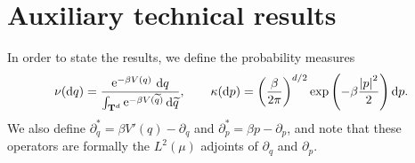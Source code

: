 \documentclass[11pt,a4paper]{article}
\DeclareMathOperator{\e}{e}
\newcommand{\expect}[0]{\mathbf{E}}
\newcommand{\torus}{\mathbf T}
\renewcommand{\d}{\mathrm d}
\theoremstyle{plain}
\numberwithin{equation}{section}
\begin{document}
\appendix
\section{Auxiliary technical results}%
\label{sec:auxiliary_technical_results}

In order to state the results, we define the probability measures
\begin{equation}
    \label{eq:definition_prob_measures}
    \nu(\d q) = \frac{\e^{- \beta V(q)} \, \d q}{\int_{\torus^d}\e^{-\beta V(\widetilde q)} \d \widetilde q},
    \qquad \kappa(\d p) = \left( \frac{\beta}{2 \pi} \right)^{d/2}\exp \left( - \beta \frac{\abs{p}^2}{2} \right) \d p.
\end{equation}
We also define $\partial_q^* = \beta V'(q) - \partial_q$ and $\partial_p^* = \beta p - \partial_p$,
and note that these operators are formally the $L^2(\mu)$ adjoints of $\partial_q$ and $\partial_p$.
\end{document}
